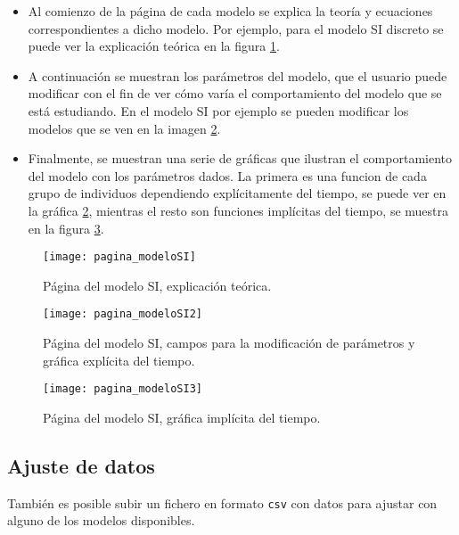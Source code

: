 \begin{itemize}
\item Al comienzo de la página de cada modelo se explica la teoría y ecuaciones correspondientes a dicho modelo. Por ejemplo, para el modelo SI discreto se puede ver la explicación teórica en la figura \ref{manual: modeloSI1}.
\item A continuación se muestran los parámetros del modelo, que el usuario puede modificar con el fin de ver cómo varía el comportamiento del modelo que se está estudiando. En el modelo SI por ejemplo se pueden modificar los modelos que se ven en la imagen \ref{manual: modeloSI2}.
\item Finalmente, se muestran una serie de gráficas que ilustran el comportamiento del modelo con los parámetros dados. La primera es una funcion de cada grupo de individuos dependiendo explícitamente del tiempo, se puede ver en la gráfica \ref{manual: modeloSI2}, mientras el resto son funciones implícitas del tiempo, se muestra en la figura \ref{manual: modeloSI3}.
\end{itemize}

\begin{figure}
\begin{center}
\caption{Página del modelo SI, explicación teórica.}
\label{manual: modeloSI1}
\texttt{[image: pagina\_modeloSI]}
\end{center}
\end{figure}

\begin{figure}
\begin{center}
\caption{Página del modelo SI, campos para la modificación de parámetros y gráfica explícita del tiempo.}
\label{manual: modeloSI2}
\texttt{[image: pagina\_modeloSI2]}
\end{center}
\end{figure}

\begin{figure}
\begin{center}
\caption{Página del modelo SI, gráfica implícita del tiempo.}
\label{manual: modeloSI3}
\texttt{[image: pagina\_modeloSI3]}
\end{center}
\end{figure}

\subsection{Ajuste de datos}

También es posible subir un fichero en formato \verb|csv| con datos para ajustar con alguno de los modelos disponibles.

